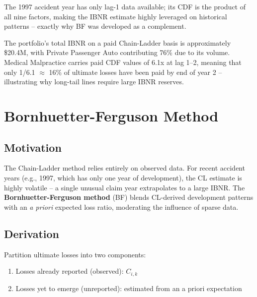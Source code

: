 The 1997 accident year has only lag-1 data available; its CDF is the
product of all nine factors, making the IBNR estimate highly leveraged
on historical patterns -- exactly why BF was developed as a complement.

\begin{keyinsight}
The portfolio's total IBNR on a paid Chain-Ladder basis is approximately
\$20.4M, with Private Passenger Auto contributing 76\% due to its volume.
Medical Malpractice carries paid CDF values of 6.1x at lag 1--2,
meaning that only 1/6.1 $\approx$ 16\% of ultimate losses have been paid
by end of year 2 -- illustrating why long-tail lines require large IBNR reserves.
\end{keyinsight}

\section{Bornhuetter-Ferguson Method}
\label{sec:ins-bf}


\subsection{Motivation}

The Chain-Ladder method relies entirely on observed data.  For recent
accident years (e.g., 1997, which has only one year of development),
the CL estimate is highly volatile -- a single unusual claim year
extrapolates to a large IBNR.  The \textbf{Bornhuetter-Ferguson method}
(BF) blends CL-derived development patterns with an \emph{a priori}
expected loss ratio, moderating the influence of sparse data.

\subsection{Derivation}

Partition ultimate losses into two components:
\begin{enumerate}
  \item Losses already reported (observed): $C_{i,k}$
  \item Losses yet to emerge (unreported): estimated from an a priori expectation
\end{enumerate}

